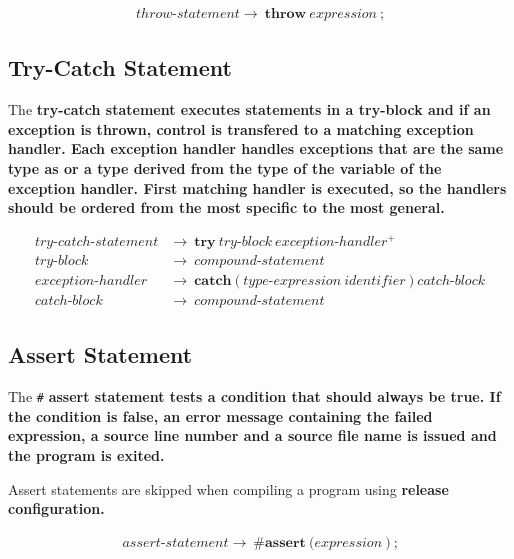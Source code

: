 \documentclass[a4paper,oneside,11pt]{article}
\begin{document}
\begin{align*}
throw\textrm{-}statement \rightarrow \> \textbf{throw} \> \hyperref[expression]{expression} \> \texttt{;}
\end{align*}

\subsection{Try-Catch Statement}\label{trystatement}

The \bf{try-catch} statement executes statements in a try-block and if an exception is thrown, control is transfered
to a matching exception handler. Each exception handler handles exceptions that are the same type as or a type derived from
the type of the variable of the exception handler. First matching handler is executed, so the handlers should be
ordered from the most specific to the most general.

\begin{align*}
try\textrm{-}catch\textrm{-}statement &\rightarrow \> \textbf{try} \> try\textrm{-}block \> exception\textrm{-}handler^+\\
try\textrm{-}block &\rightarrow \> \hyperref[compoundstatement]{compound\textrm{-}statement}\\
exception\textrm{-}handler &\rightarrow \> \textbf{catch} \> \texttt{(} \> \hyperref[typeexpr]{type\textrm{-}expression} \>
\hyperref[identifier]{identifier} \> \texttt{)} \> catch\textrm{-}block\\
catch\textrm{-}block &\rightarrow \> \hyperref[compoundstatement]{compound\textrm{-}statement}
\end{align*}

\subsection{Assert Statement}\label{assertstatement}

The \verb|#| \bf{assert} statement tests a condition that should always be true.
If the condition is false, an error message containing the failed expression, a source line number and a source file name is issued and the program is exited.

Assert statements are skipped when compiling a program using \bf{release} configuration.

\begin{align*}
assert\textrm{-}statement \rightarrow \> \texttt{\#}\textbf{assert} \> \texttt{(} \hyperref[expression]{expression} \> \texttt{)} \> \texttt{;}
\end{align*}
\end{document}
